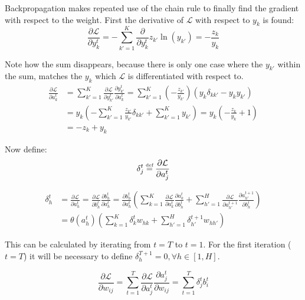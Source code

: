 Backpropagation makes repeated use of the chain rule to finally find the gradient with respect to the weight. First the derivative of $\mathcal{L}$ with respect to $y_k$ is found:
\begin{equation}
\frac{\partial \mathcal{L}}{\partial y_k^t} = - \sum_{k'=1}^K \frac{\partial}{\partial y_k^t} z_{k'} \ln(y_{k'}) = - \frac{z_k}{y_k}
\end{equation}

Note how the sum disappears, because there is only one case where the $y_{k'}$ within the sum, matches the $y_k$ which $\mathcal{L}$ is differentiated with respect to.
\begin{equation}
\begin{aligned}
\frac{\partial \mathcal{L}}{\partial a_k^t} &= \sum_{k'=1}^K \frac{\partial \mathcal{L}}{\partial y_{k'}^t} \frac{\partial y_{k'}^t}{\partial a_k^t} = \sum_{k'=1}^K \left(- \frac{z_{k'}}{y_{k'}}\right) \left( y_k \delta_{k k'} - y_k y_{k'} \right) \\
&= y_k \left( - \sum_{k'=1}^K \frac{z_{k'}}{y_{k'}}\delta_{k k'} + \sum_{k'=1}^K y_{k'} \right) = y_k \left( - \frac{z_k}{y_k} + 1 \right) \\
&= - z_k + y_k
\end{aligned}
\end{equation}

Now define:
\begin{equation}
\delta_j^t \defeq \frac{\partial \mathcal{L}}{\partial a_j^t}
\end{equation}

\begin{equation}
\begin{aligned}
\delta_h^t &= \frac{\partial \mathcal{L}}{\partial a_h^t} = \frac{\partial \mathcal{L}}{\partial b_h^t} \frac{\partial b_h^t}{\partial a_h^t} = \frac{\partial b_h^t}{\partial a_h^t} \left( \sum_{k=1}^K \frac{\partial \mathcal{L}}{\partial a_k^t} \frac{\partial a_k^t}{\partial b_h^t} + \sum_{h'=1}^H \frac{\partial \mathcal{L}}{\partial a_{h'}^{t+1}} \frac{\partial a_{h'}^{t+1}}{\partial b_h^t} \right) \\
&= \theta(a_h^t) \left( \sum_{k=1}^K \delta_k^t w_{h k} + \sum_{h'=1}^H \delta_{h'}^{t+1} w_{h h'}\right)
\end{aligned}
\end{equation}

This can be calculated by iterating from $t = T$ to $t = 1$. For the first iteration ($t = T$) it will be necessary to define $\delta_{h}^{T+1} = 0, \forall h \in [1, H]$.

\begin{equation}
\frac{\partial \mathcal{L}}{\partial w_{ij}} = \sum_{t=1}^T \frac{\partial \mathcal{L}}{\partial a_j^t} \frac{\partial a_j^t}{\partial w_{ij}} = \sum_{t=1}^T \delta_j^t b_i^t
\end{equation}
